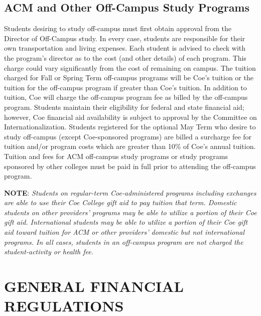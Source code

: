 \documentclass[
  letterpaper,
]{scrbook}
\begin{document}
\hypertarget{acm-and-other-off-campus-study-programs}{%
\subsection{ACM and Other Off-Campus Study
Programs}\label{acm-and-other-off-campus-study-programs}}

Students desiring to study off-campus must first obtain approval from
the Director of Off-Campus study. In every case, students are
responsible for their own transportation and living expenses. Each
student is advised to check with the program's director as to the cost
(and other details) of each program. This charge could vary
significantly from the cost of remaining on campus. The tuition charged
for Fall or Spring Term off-campus programs will be Coe's tuition or the
tuition for the off-campus program if greater than Coe's tuition. In
addition to tuition, Coe will charge the off-campus program fee as
billed by the off-campus program. Students maintain their eligibility
for federal and state financial aid; however, Coe financial aid
availability is subject to approval by the Committee on
Internationalization. Students registered for the optional May Term who
desire to study off-campus (except Coe-sponsored programs) are billed a
surcharge fee for tuition and/or program costs which are greater than
10\% of Coe's annual tuition. Tuition and fees for ACM off-campus study
programs or study programs sponsored by other colleges must be paid in
full prior to attending the off-campus program.

\textbf{NOTE}: \emph{Students on regular-term Coe-administered programs
including exchanges are able to use their Coe College gift aid to pay
tuition that term. Domestic students on other providers' programs may be
able to utilize a portion of their Coe gift aid. International students
may be able to utilize a portion of their Coe gift aid toward tuition
for ACM or other providers' domestic but not international programs. In
all cases, students in an off-campus program are not charged the
student-activity or health fee.}

\hypertarget{general-financial-regulations}{%
\section{GENERAL FINANCIAL
REGULATIONS}\label{general-financial-regulations}}
\end{document}
